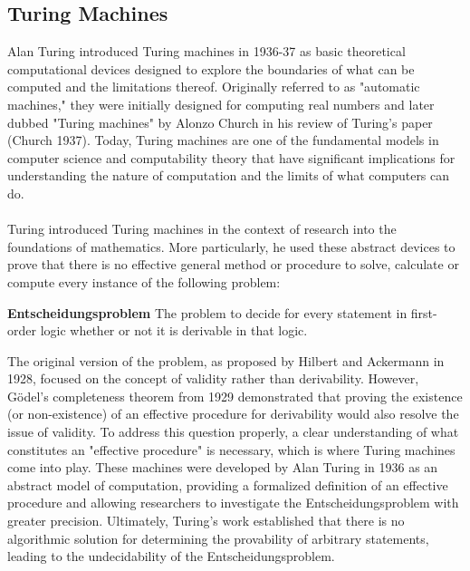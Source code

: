 \documentclass[10pt,a4paper]{article}
\newcounter{theo}
\begin{document}
            \subsection{Turing Machines}
                Alan Turing introduced Turing machines in 1936-37 as basic theoretical computational devices designed to explore the boundaries of what can be computed and the limitations thereof. Originally referred to as "automatic machines," they were initially designed for computing real numbers and later dubbed "Turing machines" by Alonzo Church in his review of Turing's paper (Church 1937). Today, Turing machines are one of the fundamental models in computer science and computability theory that have significant implications for understanding the nature of computation and the limits of what computers can do.
                \\
                \\
                Turing introduced Turing machines in the context of research into the foundations of mathematics. More particularly, he used these abstract devices to prove that there is no effective general method or procedure to solve, calculate or compute every instance of the following problem:
                \begin{qt}
                    \textbf{Entscheidungsproblem} The problem to decide for every statement in first-order logic whether or not it is derivable in that logic.\cite{sep-spacetime-bebecome}
                \end{qt}
                The original version of the problem, as proposed by Hilbert and Ackermann in 1928, focused on the concept of validity rather than derivability. However, Gödel's completeness theorem from 1929 demonstrated that proving the existence (or non-existence) of an effective procedure for derivability would also resolve the issue of validity. To address this question properly, a clear understanding of what constitutes an "effective procedure" is necessary, which is where Turing machines come into play. These machines were developed by Alan Turing in 1936 as an abstract model of computation, providing a formalized definition of an effective procedure and allowing researchers to investigate the Entscheidungsproblem with greater precision. Ultimately, Turing's work established that there is no algorithmic solution for determining the provability of arbitrary statements, leading to the undecidability of the Entscheidungsproblem.
                \\
                \\
\end{document}
